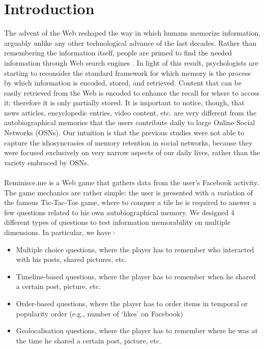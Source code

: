 \chapter*{Introduction}
The advent of the Web reshaped the way in which humans memorize information, arguably unlike any other technological advance of the last decades. Rather than remembering the information itself, people are primed to find the needed information through Web search engines \cite{googlemem} . In light of this result, psychologists are starting to reconsider the standard framework for which memory is the process by which information is encoded, stored, and retrieved. Content that can be easily retrieved from the Web is encoded to enhance the recall for where to access it; therefore it is only partially stored. It is important to notice, though, that news articles, encyclopedic entries, video content, etc. are very different from the autobiographical memories that the users contribute daily to large Online Social Networks (OSNs). Our intuition is that the previous studies \cite{retenauto} \cite{howhappy} were not able to capture the idiosyncrasies of memory retention in social networks, because they were focused exclusively on very narrow aspects of our daily lives, rather than the variety embraced by OSNs.\\\\
Reminisce.me is a Web game that gathers data from the user’s Facebook activity. The game mechanics are rather simple: the user is presented with a variation of the famous Tic-Tac-Toe game, where to conquer a tile he is required to answer a few questions related to his own autobiographical memory. We designed 4 different types of questions to test information memorability on multiple
dimensions. In particular, we have :
\begin{itemize}
	\item Multiple choice questions, where the player has to remember who interacted with his posts, shared pictures, etc.
	\item Timeline-based questions, where the player has to remember when he shared a certain post, picture, etc.
	\item Order-based questions, where the player has to order items in temporal or popularity order (e.g., number of `likes' on Facebook)
	\item Geolocalisation questions, where the player has to remember where he was at the time he shared a certain post, picture, etc.
\end{itemize}
